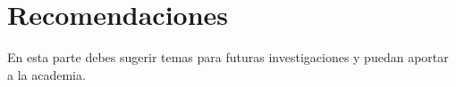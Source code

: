 \chapter*{Recomendaciones}

En esta parte debes sugerir temas para futuras investigaciones y puedan aportar a la academia.